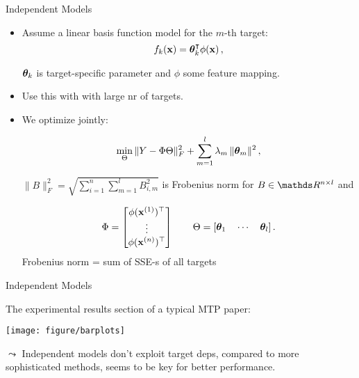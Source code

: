 \documentclass[11pt,compress,t,notes=noshow, xcolor=table]{beamer}
\begin{document}
\begin{frame}{Independent Models}

	\begin{itemize}
	
		\item Assume a linear basis function model for the $m$-th target: 
		\begin{equation*}
			f_{k}(\mathbf{x}) = \bm{\theta}_k^\intercal \phi(\mathbf{x}) \,,
			\label{eq:binrel}
		\end{equation*}

		$\bm{\theta}_k$ is target-specific parameter and $\phi$ some feature mapping.
        \item Use this with with large nr of targets. 

		\item We optimize jointly:
  
		\begin{equation*}
			\label{eq:multiridge}
			\min_\Theta \|Y - \Phi \Theta \|^2_F +  \sum_{m=1}^l \lambda_m \,\|\bm{\theta}_m\|^2 \,,
		\end{equation*}

		$ \| B \|^2_F  = \sqrt{ \sum_{i=1}^n \sum_{m=1}^l B_{i,m}^2 } $ is Frobenius norm for $B \in \R^{n \times l}$ and 
	
		\begin{equation*}
			\label{eq:notation}
			\Phi = \begin{bmatrix} \phi(\mathbf{x}^{(1)})^\top \\ \vdots \\ \phi(\mathbf{x}^{(n)})^\top \end{bmatrix} \qquad \Theta = [\bm{\theta}_1 \quad \cdots \quad \bm{\theta}_l] \,.
		\end{equation*}
  Frobenius norm = sum of SSE-s of all targets
	\end{itemize}

\end{frame}

\begin{frame}{Independent Models}

	The experimental results section of a typical MTP paper: 

	\begin{center}
		\texttt{[image: figure/barplots]} \\
	\end{center}

	$\leadsto$ Independent models don't exploit target deps, compared to more sophisticated methods, seems to be key for better performance.

\end{frame}
\end{document}
